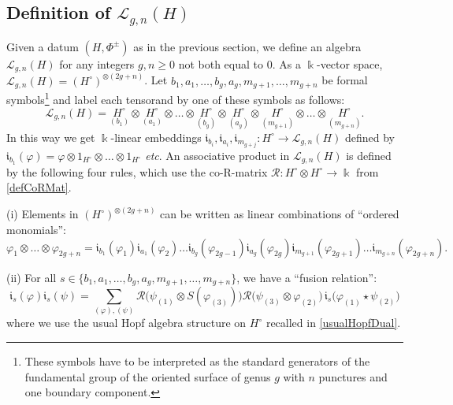 \documentclass[11pt]{amsart}
\begin{document}
\subsection{Definition of \texorpdfstring{$\mathcal{L}_{g,n}(H)$}{the graph algebra}}\label{subsecDefLgnH}
\indent Given a datum $(H,\Phi^{\pm})$ as in the previous section, we define an algebra $\mathcal{L}_{g,n}(H)$ for any integers $g,n \geq 0$ not both equal to $0$. As a $\Bbbk$-vector space, $\mathcal{L}_{g,n}(H) = (H^{\circ})^{\otimes (2g+n)}$. Let $b_1,a_1,\ldots,b_g,a_g,m_{g+1},\ldots,m_{g+n}$ be formal symbols\footnote{These symbols have to be interpreted as the standard generators of the fundamental group of the oriented surface of genus $g$ with $n$ punctures and one boundary component.} and label each tensorand by one of these symbols as follows:
\begin{equation}\label{labelCopiesHcirc}
\mathcal{L}_{g,n}(H) = \underset{(b_1)}{H^{\circ}} \otimes \underset{(a_1)}{H^{\circ}} \otimes \ldots \otimes \underset{(b_g)}{H^{\circ}} \otimes \underset{(a_g)}{H^{\circ}} \otimes \underset{(m_{g+1})}{H^{\circ}} \otimes \ldots \otimes \underset{(m_{g+n})}{H^{\circ}}.
\end{equation}
In this way we get $\Bbbk$-linear embeddings $\mathfrak{i}_{b_i}, \mathfrak{i}_{a_i}, \mathfrak{i}_{m_{g+j}} : H^{\circ} \to \mathcal{L}_{g,n}(H)$ defined by $\mathfrak{i}_{b_1}(\varphi) = \varphi \otimes 1_{H^\circ} \otimes \ldots \otimes 1_{H^\circ}$ {\it etc}. An associative product in $\mathcal{L}_{g,n}(H)$ is defined by the following four rules, which use the co-R-matrix $\mathcal{R} : H^\circ \otimes H^\circ \to \Bbbk$ from \eqref{defCoRMat}.

\smallskip

\noindent (i) Elements in $(H^\circ)^{\otimes (2g+n)}$ can be written as linear combinations of ``ordered monomials'':
\begin{equation}\label{monomialRelLgn}
\varphi_1 \otimes \ldots \otimes \varphi_{2g+n} = \mathfrak{i}_{b_1}(\varphi_1)\mathfrak{i}_{a_1}(\varphi_2) \ldots \mathfrak{i}_{b_g}(\varphi_{2g-1})\mathfrak{i}_{a_g}(\varphi_{2g})\mathfrak{i}_{m_{g+1}}(\varphi_{2g+1}) \ldots \mathfrak{i}_{m_{g+n}}(\varphi_{2g+n}).
\end{equation}

\noindent (ii) For all $s \in \{ b_1,a_1, \ldots, b_g,a_g,m_{g+1}, \ldots, m_{g+n} \}$, we have a ``fusion relation'':
\begin{equation}\label{fusionRelL01}
\mathfrak{i}_s(\varphi) \mathfrak{i}_s(\psi) = \sum_{(\varphi),(\psi)}\mathcal{R}\bigl( \psi_{(1)} \otimes S(\varphi_{(3)}) \bigr) \mathcal{R}\bigl( \psi_{(3)} \otimes \varphi_{(2)} \bigr) \, \mathfrak{i}_s\bigl(\varphi_{(1)} \star \psi_{(2)} \bigr)
\end{equation}
where we use the usual Hopf algebra structure on $H^{\circ}$ recalled in \eqref{usualHopfDual}.
\end{document}
